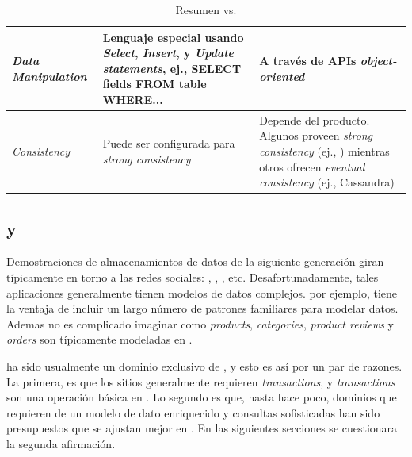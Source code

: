 \begin{table}[h!]
\begin{tabular}{ |L{0.1\paperwidth}|L{0.3\paperwidth}|L{0.3\paperwidth}|}
\\ \hline
	\textit{Data Manipulation}&
	
	Lenguaje especial usando \textit{Select}, \textit{Insert}, y \textit{Update statements}, ej., SELECT fields FROM table WHERE...&	
	
	A través de APIs \textit{object-oriented}

\\ \hline

	\textit{Consistency}&
	
	Puede ser configurada para \textit{strong consistency}&
	
	Depende del producto. Algunos proveen \textit{strong consistency} (ej., \mongodb) mientras otros ofrecen \textit{eventual consistency} (ej., Cassandra)

\\ \hline
\end{tabular}
    \caption{ Resumen \nosql vs. \sql}
    \label{tab:SQL_vs_noSQL_summary}
\end{table}

\subsection{\mongodb y \ecommerce \cite{online_mongodb_ecommerce}}
\label{cap:justificacion_proyecto:MongoDB_ECommerce}

Demostraciones de almacenamientos de datos de la siguiente generación giran típicamente en torno a las redes sociales: \twitter, \facebook, \foursquare, etc. Desafortunadamente, tales aplicaciones generalmente tienen modelos de datos complejos. \ecommerce por ejemplo, tiene la ventaja de incluir un largo número de patrones familiares para modelar datos. Ademas no es complicado imaginar como \textit{products}, \textit{categories}, \textit{product reviews} y \textit{orders} son típicamente modeladas en \rdbms.

\ecommerce ha sido usualmente un dominio exclusivo de \rdbms, y esto es así por un par de razones. La primera, es que los sitios \ecommerce generalmente requieren \textit{transactions}, y \textit{transactions} son una operación básica en \rdbms. Lo segundo es que, hasta hace poco, dominios que requieren de un modelo de dato enriquecido y consultas sofisticadas han sido presupuestos que se ajustan mejor en \rdbms. En las siguientes secciones se cuestionara la segunda afirmación. 

